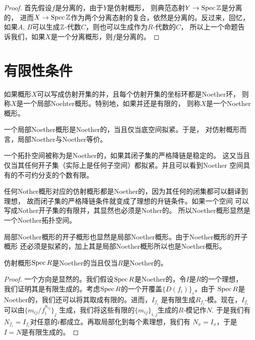 \begin{proof}
首先假设$f$是分离的，由于$Y$是仿射概形，
则典范态射$Y\to \operatorname{Spec} \mathbb{Z}$是分离的，
进而$X\to\operatorname{Spec} \mathbb{Z}$作为两个分离态射的复合，依然是分离的。反过来，回忆，
如果$A$, $B$可以生成$\mathbb{Z}$-代数$C$，则也可以生成作为$R$-代数的$C$，
所以上一个命题告诉我们，如果$X$是一个分离概形，则$f$是分离的。
\end{proof}



\section{有限性条件}

\begin{para}[（局部）Noether概形]
	如果概形$X$可以写成仿射开集的并，且每个仿射开集的坐标环都是Noether环，
	则称$X$是一个局部Noehter概形。特别地，如果并还是有限的，
	则称$X$是一个Noether概形。
\end{para}

一个局部Noether概形是Noether的，当且仅当底空间拟紧。于是，
对仿射概形而言，局部Noether与Noether等价。

一个拓扑空间被称为是Noether的，如果其闭子集的严格降链是稳定的。
这又当且仅当其任何开子集（实际上是任何子空间）都拟紧。并且可以看到Noether
空间具有的不可约分支的个数有限。

任何Nother概形对应的仿射概形都是Noether的，因为其任何的闭集都可以翻译到理想，
故而闭子集的严格降链条件就变成了理想的升链条件。如果一个空间
可以写成Nother开子集的有限并，其显然也必须是Nother的。
所以Noether概形显然是一个Noether拓扑空间。

局部Noether概形的开子概形也显然是局部Noether概形。由于Noether概形的开子概形
还必须是拟紧的，加上其是局部Noether概形所以也是Noether概形。

\begin{pro}
	仿射概形$\operatorname{Spec} R$是Noether的当且仅当$R$是Noether的。
\end{pro}

\begin{proof}
一个方向是显然的。我们假设$\operatorname{Spec} R$是Noether的，令$I$是$R$的一个理想，
我们证明其是有限生成的。考虑$\operatorname{Spec} R$的一个开覆盖$\{D(f_i)\}_i$，由于
$\operatorname{Spec} R$是Noether的，我们还可以将其取成有限的。进而，$I_{f_i}$
是有限生成$R_{f_i}$-模。现在，$I_{f_i}$可以由$\{m_{ij}/f_i^{n_{ij}}\}_j$
生成，我们将这些有限的$\{m_{ij}\}_{i,j}$生成的$R$-模记作$N$. 于是我们有
$N_{f_i}=I_{f_i}$对任意的$i$都成立。再取局部化到每个素理想，我们有
$N_{x}=I_x$，于是$I=N$是有限生成的。
\end{proof}


